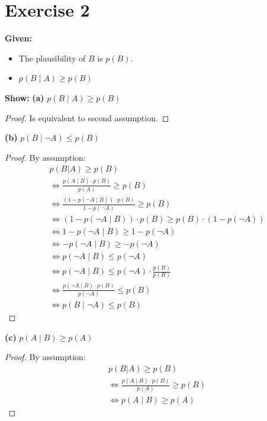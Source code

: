 \documentclass{article}
\begin{document}
\section*{Exercise 2}
\textbf{Given:} 
\begin{itemize}
\item The plausibility of $B$ is $p(B)$.
\item $p(B \mid A) \geq p(B)$
\end{itemize}

\textbf{Show:}
\textbf{(a)} $p(B \mid A) \geq p(B)$


\begin{proof}
Is equivalent to second assumption.
\end{proof}


\textbf{(b)} $p(B \mid \neg A) \leq p(B)$
\begin{proof}
By assumption:
\begin{align*}
& p(B|A) \geq p(B) \\
& \Leftrightarrow \frac{p(A \mid B) \cdot p(B)}{p(A)} \geq p(B)\\
& \Leftrightarrow \frac{(1-p(\neg A \mid B)) \cdot p(B)}{1-p(\neg A)} \geq p(B) \\
& \Leftrightarrow (1-p(\neg A \mid B)) \cdot p(B) \geq p(B)\cdot (1-p(\neg A)) \\
& \Leftrightarrow 1-p(\neg A \mid B)  \geq  1-p(\neg A) \\
& \Leftrightarrow -p(\neg A \mid B)  \geq  -p(\neg A) \\
& \Leftrightarrow p(\neg A \mid B)  \leq  p(\neg A) \\
& \Leftrightarrow p(\neg A \mid B)  \leq  p(\neg A)\cdot \frac{p(B)}{p(B)} \\
& \Leftrightarrow \frac{p(\neg A \mid B) \cdot p(B)}{p(\neg A)}  \leq  p(B) \\
& \Leftrightarrow p(B \mid \neg A)   \leq  p(B)
\end{align*}
\end{proof}



\textbf{(c)} $p(A \mid B) \geq p(A)$
\begin{proof}
By assumption:
\begin{align*}
& p(B|A) \geq p(B) \\
& \Leftrightarrow \frac{p(A \mid B) \cdot p(B)}{p(A)} \geq p(B)\\
& \Leftrightarrow p(A \mid B) \geq p(A) 
\end{align*}
\end{proof}
\end{document}
